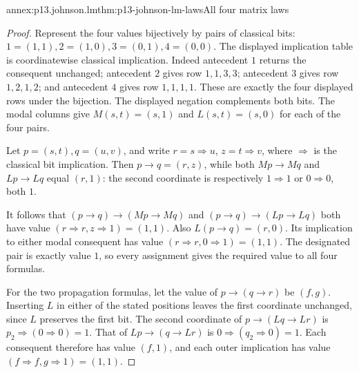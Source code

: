 \begin{annexitem}{annex:p13.johnson.lm}{thm:p13-johnson-lm-laws}{All four matrix laws}
\begin{proof}
Represent the four values bijectively by pairs of classical bits:
\(1=(1,1),2=(1,0),3=(0,1),4=(0,0)\).
The displayed implication table is coordinatewise classical implication.
Indeed antecedent \(1\) returns the consequent unchanged; antecedent
\(2\) gives row \(1,1,3,3\); antecedent \(3\) gives row
\(1,2,1,2\); and antecedent \(4\) gives row \(1,1,1,1\).
These are exactly the four displayed rows under the bijection.
The displayed negation complements both bits. The modal columns give
\(M(s,t)=(s,1)\) and \(L(s,t)=(s,0)\) for each of the four pairs.

Let \(p=(s,t),q=(u,v)\), and write
\(r=s\Rightarrow u\), \(z=t\Rightarrow v\), where
\(\Rightarrow\) is the classical bit implication. Then
\(p\to q=(r,z)\), while both \(Mp\to Mq\) and
\(Lp\to Lq\) equal \((r,1)\):
the second coordinate is respectively \(1\Rightarrow1\) or
\(0\Rightarrow0\), both \(1\).

It follows that
\((p\to q)\to(Mp\to Mq)\) and
\((p\to q)\to(Lp\to Lq)\) both have value
\((r\Rightarrow r,z\Rightarrow1)=(1,1)\).
Also \(L(p\to q)=(r,0)\). Its implication to either modal
consequent has value
\((r\Rightarrow r,0\Rightarrow1)=(1,1)\).
The designated pair is exactly value \(1\), so every assignment gives
the required value to all four formulas.

For the two propagation formulas, let the value of
\(p\to(q\to r)\) be \((f,g)\). Inserting \(L\) in either of the
stated positions leaves the first coordinate unchanged, since \(L\)
preserves the first bit. The second coordinate of
\(p\to(Lq\to Lr)\) is \(p_2\Rightarrow(0\Rightarrow0)=1\).
That of \(Lp\to(q\to Lr)\) is
\(0\Rightarrow(q_2\Rightarrow0)=1\).
Each consequent therefore has value \((f,1)\), and each outer
implication has value \((f\Rightarrow f,g\Rightarrow1)=(1,1)\).
\end{proof}
\end{annexitem}

